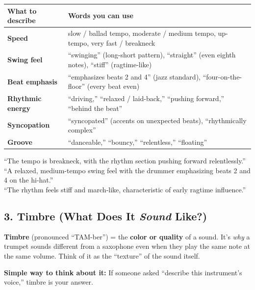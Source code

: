 \documentclass[11pt,letterpaper]{article}
\begin{document}
\begin{small}
\begin{tabularx}{\textwidth}{>{\bfseries}p{3cm} X}
\toprule
\textbf{What to describe} & \textbf{Words you can use} \\
\midrule
Speed & slow / ballad tempo, moderate / medium tempo, up-tempo, very fast / breakneck \\
Swing feel & ``swinging'' (long-short pattern), ``straight'' (even eighth notes), ``stiff'' (ragtime-like) \\
Beat emphasis & ``emphasizes beats 2 and 4'' (jazz standard), ``four-on-the-floor'' (every beat even) \\
Rhythmic energy & ``driving,'' ``relaxed / laid-back,'' ``pushing forward,'' ``behind the beat'' \\
Syncopation & ``syncopated'' (accents on unexpected beats), ``rhythmically complex'' \\
Groove & ``danceable,'' ``bouncy,'' ``relentless,'' ``floating'' \\
\bottomrule
\end{tabularx}
\end{small}

\begin{tcolorbox}[examplebox, title={Examples}]
``The tempo is breakneck, with the rhythm section pushing forward relentlessly.''\\
``A relaxed, medium-tempo swing feel with the drummer emphasizing beats 2 and 4 on the hi-hat.''\\
``The rhythm feels stiff and march-like, characteristic of early ragtime influence.''
\end{tcolorbox}

\subsection{3. Timbre (What Does It \emph{Sound} Like?)}

\textbf{Timbre} (pronounced ``TAM-ber'') = the \textbf{color or quality} of a sound. It's \emph{why} a trumpet sounds different from a saxophone even when they play the same note at the same volume. Think of it as the ``texture'' of the sound itself.

\textbf{Simple way to think about it:} If someone asked ``describe this instrument's voice,'' timbre is your answer.
\end{document}
